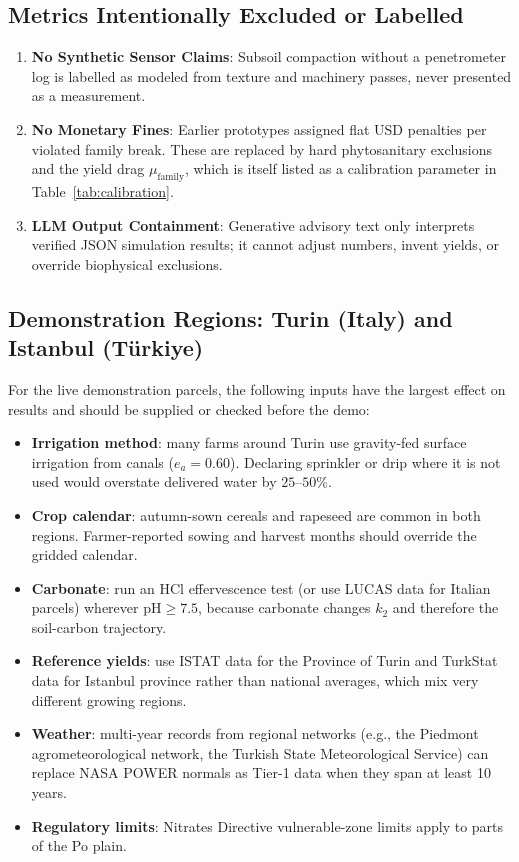 \subsection{Metrics Intentionally Excluded or Labelled}
\begin{enumerate}[leftmargin=1.5em]
  \item \textbf{No Synthetic Sensor Claims}: Subsoil compaction without a penetrometer log is labelled as modeled from texture and machinery passes, never presented as a measurement.
  \item \textbf{No Monetary Fines}: Earlier prototypes assigned flat USD penalties per violated family break. These are replaced by hard phytosanitary exclusions and the yield drag $\mu_{\mathrm{family}}$, which is itself listed as a calibration parameter in Table~\ref{tab:calibration}.
  \item \textbf{LLM Output Containment}: Generative advisory text only interprets verified JSON simulation results; it cannot adjust numbers, invent yields, or override biophysical exclusions.
\end{enumerate}

\subsection{Demonstration Regions: Turin (Italy) and Istanbul (T{\"u}rkiye)}
For the live demonstration parcels, the following inputs have the largest effect on results and should be supplied or checked before the demo:
\begin{itemize}[leftmargin=1.5em]
  \item \textbf{Irrigation method}: many farms around Turin use gravity-fed surface irrigation from canals ($e_a = 0.60$). Declaring sprinkler or drip where it is not used would overstate delivered water by $25$--$50\%$.
  \item \textbf{Crop calendar}: autumn-sown cereals and rapeseed are common in both regions. Farmer-reported sowing and harvest months should override the gridded calendar.
  \item \textbf{Carbonate}: run an HCl effervescence test (or use LUCAS data for Italian parcels) wherever $\mathrm{pH} \ge 7.5$, because carbonate changes $k_2$ and therefore the soil-carbon trajectory.
  \item \textbf{Reference yields}: use ISTAT data for the Province of Turin and TurkStat data for Istanbul province rather than national averages, which mix very different growing regions.
  \item \textbf{Weather}: multi-year records from regional networks (e.g., the Piedmont agrometeorological network, the Turkish State Meteorological Service) can replace NASA POWER normals as Tier-1 data when they span at least 10 years.
  \item \textbf{Regulatory limits}: Nitrates Directive vulnerable-zone limits apply to parts of the Po plain.
\end{itemize}

